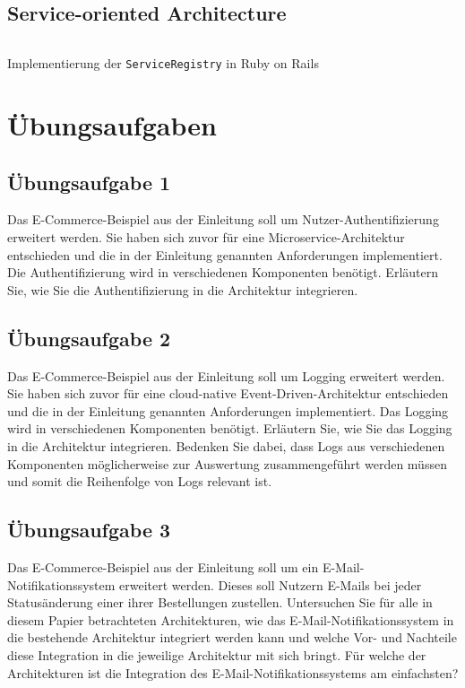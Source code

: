 \documentclass[acmtog]{acmart}
\begin{document}
\subsection{Service-oriented Architecture}
\label{app:code:soa:registry}
\begin{listing}[H]
  \tiny
  \inputminted[linenos=true]{ruby}{code/soa/service_registry.rb}
  \caption{Implementierung der \texttt{ServiceRegistry} in Ruby on Rails}
\end{listing}

\section{Übungsaufgaben}
\subsection{Übungsaufgabe 1}
Das E-Commerce-Beispiel aus der Einleitung soll um Nutzer-Authentifizierung erweitert werden.
Sie haben sich zuvor für eine Microservice-Architektur entschieden und die in der Einleitung genannten Anforderungen implementiert.
Die Authentifizierung wird in verschiedenen Komponenten benötigt.
Erläutern Sie, wie Sie die Authentifizierung in die Architektur integrieren.

\subsection{Übungsaufgabe 2}
Das E-Commerce-Beispiel aus der Einleitung soll um Logging erweitert werden.
Sie haben sich zuvor für eine cloud-native Event-Driven-Architektur entschieden und die in der Einleitung genannten Anforderungen implementiert.
Das Logging wird in verschiedenen Komponenten benötigt.
Erläutern Sie, wie Sie das Logging in die Architektur integrieren.
Bedenken Sie dabei, dass Logs aus verschiedenen Komponenten möglicherweise zur Auswertung zusammengeführt werden müssen und somit die Reihenfolge von Logs relevant ist.

\subsection{Übungsaufgabe 3}
Das E-Commerce-Beispiel aus der Einleitung soll um ein E-Mail-Notifikationssystem erweitert werden.
Dieses soll Nutzern E-Mails bei jeder Statusänderung einer ihrer Bestellungen zustellen.
Untersuchen Sie für alle in diesem Papier betrachteten Architekturen, wie das E-Mail-Notifikationssystem in die bestehende Architektur integriert werden kann
und welche Vor- und Nachteile diese Integration in die jeweilige Architektur mit sich bringt.
Für welche der Architekturen ist die Integration des E-Mail-Notifikationssystems am einfachsten?
\end{document}

